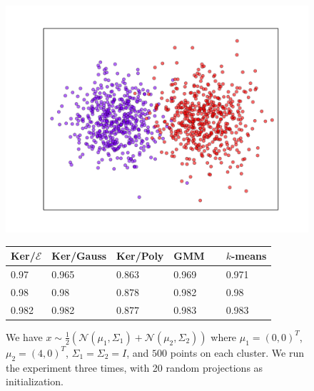 \documentclass[aps,preprint,nofootinbib,floatfix]{revtex4-1}
\begin{document}
\begin{figure}
\begin{minipage}{.49\textwidth}
\includegraphics[scale=.45]{two_gaussians_separated.pdf}
\end{minipage}
\begin{minipage}{.49\textwidth}
\begin{tabular}{ l l l l l}
\hline
Ker/$\mathcal{E}$ & Ker/Gauss & Ker/Poly & GMM~~ & $k$-means \\
\hline
0.97 &
0.965 &
0.863 &
0.969 & 
0.971 \\
0.98 &
0.98 &
0.878 &
0.982 &
0.98 \\
0.982 &
0.982 &
0.877 &
0.983 &
0.983 \\
\hline
\end{tabular}
\end{minipage}
\caption{\label{fig:weird1}
We have $x \sim \tfrac{1}{2}\left( \mathcal{N}(\mu_1, \Sigma_1) +
\mathcal{N}(\mu_2, \Sigma_2)\right)$ where $\mu_1 = (0,0)^T$, $\mu_2=(4,0)^T$,
$\Sigma_1 = \Sigma_2 = I$,
and $500$ points on each cluster. We run the experiment three times,
with 20 random projections as initialization.
}
\end{figure}
\end{document}
